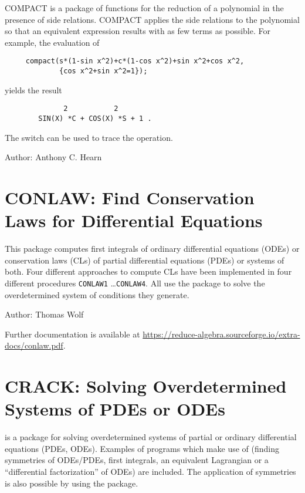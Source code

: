 COMPACT is a package of functions for the reduction of a polynomial in the
presence of side relations.  COMPACT applies the side relations to the
polynomial so that an equivalent expression results with as few terms as
possible.  For example, the evaluation of
\begin{verbatim}
     compact(s*(1-sin x^2)+c*(1-cos x^2)+sin x^2+cos x^2,
             {cos x^2+sin x^2=1});
\end{verbatim}
yields the result\pagebreak[1]
\begin{verbatim}
              2           2
        SIN(X) *C + COS(X) *S + 1 .
\end{verbatim}
The switch  can be used to trace the operation.

Author: Anthony C. Hearn
\fi

\section{CONLAW: Find Conservation Laws for Differential Equations}

This package computes first integrals of ordinary differential
equations (ODEs) or conservation laws (CLs) of partial differential
equations (PDEs) or systems of both.  Four different approaches to
compute CLs have been implemented in four different procedures
\texttt{CONLAW1} \ldots \texttt{CONLAW4}.  All use the package
\hyperref[package:CRACK]{} to solve the overdetermined
system of conditions they generate.

Author: Thomas Wolf

\begin{sloppypar}
  Further documentation is available at
  \url{https://reduce-algebra.sourceforge.io/extra-docs/conlaw.pdf}.
\end{sloppypar}

\newpage

\section{CRACK: Solving Overdetermined Systems of PDEs or ODEs}
\label{package:CRACK}

 is a package for solving overdetermined systems of
partial or ordinary differential equations (PDEs, ODEs).  Examples of
programs which make use of  (finding symmetries of
ODEs/PDEs, first integrals, an equivalent Lagrangian or a
``differential factorization'' of ODEs) are included.  The application
of symmetries is also possible by using the
\hyperref[package:APPLYSYM]{} package.

